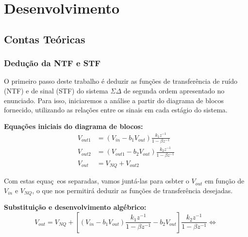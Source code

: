 \section{Desenvolvimento}
\label{sec:desenvolvimento}

\subsection{Contas Teóricas}
\subsubsection{Dedução da NTF e STF}

O primeiro passo deste trabalho é deduzir as funções de transferência de ruído (NTF) e de sinal (STF) do
sistema $\Sigma\Delta$ de segunda ordem apresentado no enunciado.
Para isso, iniciaremos a análise a partir do diagrama de blocos fornecido, utilizando as relações entre os
sinais em cada estágio do sistema.

\textbf{Equações iniciais do diagrama de blocos:}
\begin{align*}
    V_{out1} &= (V_{in} - b_1 V_{out}) \frac{k_1 z^{-1}}{1 - \beta z^{-1}} \\
    V_{out2} &= (V_{out1} - b_2 V_{out}) \frac{k_2 z^{-1}}{1 - \beta z^{-1}} \\
    V_{out}  &= V_{NQ} + V_{out2}
\end{align*}

Com estas equaç~eos separadas, vamos juntá-las para osbter o $V_{out}$ em função de $V_{in}$ e $V_{NQ}$, o que nos
permitirá deduzir as funções de transferência desejadas.

\textbf{Substituição e desenvolvimento algébrico:}
\[
V_{out} = V_{NQ} + \left[ (V_{in} - b_1 V_{out}) \frac{k_1 z^{-1}}{1 - \beta z^{-1}} - b_2 V_{out} \right] \frac{k_2 z^{-1}}{1 - \beta z^{-1}} \iff
\]

